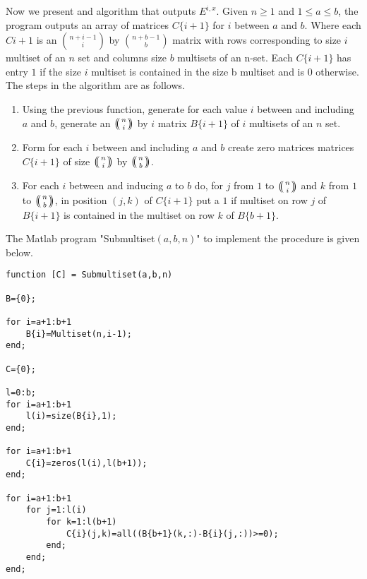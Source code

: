\documentclass{article}
\theoremstyle{plain}
\theoremstyle{definition}
\numberwithin{thm}{section}
\begin{document}
				Now we present and algorithm that outputs $E^{i,x}$.
				Given $n\geq 1$ and $1\leq a \leq b$, the program outputs an array of matrices $C\{ i+1\}$ for $i$ between $a$ and $b$.
				Where each $C{i+1}$ is an $\binom{n+i-1}{i}$ by $\binom{n+b-1}{b}$ matrix
				with rows corresponding to size $i$ multiset of an $n$ set and
				columns size $b$ multisets of an n-set.
				Each $C\{ i+1 \}$ has entry $1$ if the size $i$ multiset is contained in the size b multiset and is $0$ otherwise.
				The steps in the algorithm are as follows.
					\begin{enumerate}
						\item
							Using the previous function, generate for each value $i$ between and including  $a$ and $b$, generate an ${\ensuremath{\left(\kern-.3em\left(\genfrac{}{}{0pt}{}{{n}}{{i}}\right)\kern-.3em\right)}}$ by $i$
							matrix $B\{ i+1 \}$ of $i$ multisets of an $n$ set.
						\item
							Form for each $i$ between and including $a$ and $b$ create zero matrices matrices $C\{ i+1 \}$ of size ${\ensuremath{\left(\kern-.3em\left(\genfrac{}{}{0pt}{}{{n}}{{i}}\right)\kern-.3em\right)}}$ by ${\ensuremath{\left(\kern-.3em\left(\genfrac{}{}{0pt}{}{{n}}{{b}}\right)\kern-.3em\right)}}$.
						\item
							For each $i$ between and inducing $a$ to $b$ do,
							for $j$ from $1$ to ${\ensuremath{\left(\kern-.3em\left(\genfrac{}{}{0pt}{}{{n}}{{i}}\right)\kern-.3em\right)}}$ and $k$ from $1$ to ${\ensuremath{\left(\kern-.3em\left(\genfrac{}{}{0pt}{}{{n}}{{b}}\right)\kern-.3em\right)}}$,
							in position $(j,k)$ of $C\{ i+1 \}$ put a $1$ if multiset on row $j$ of $B\{ i+1 \}$ is contained in the multiset on row $k$ of $B\{ b+1 \}$.
					\end{enumerate}
			
				The Matlab program "Submultiset$(a,b,n)$" to implement the procedure is given below.
				
				\begin{lstlisting}[frame=single]
function [C] = Submultiset(a,b,n)

B={0};

for i=a+1:b+1  
    B{i}=Multiset(n,i-1);
end;

C={0};

l=0:b;
for i=a+1:b+1
    l(i)=size(B{i},1);
end;

for i=a+1:b+1
    C{i}=zeros(l(i),l(b+1)); 
end;

for i=a+1:b+1
    for j=1:l(i)
        for k=1:l(b+1)
            C{i}(j,k)=all((B{b+1}(k,:)-B{i}(j,:))>=0);
        end;
    end;
end;
				\end{lstlisting}
			
\end{document}
